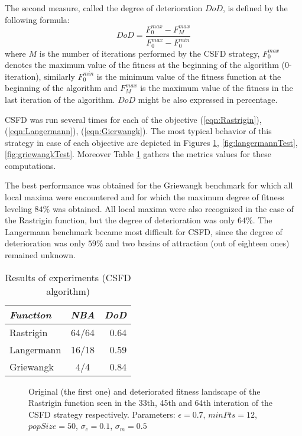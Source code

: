 The second measure, called the degree of deterioration $DoD$, is
defined by the following formula:
\begin{equation}
\label{eq:dod}
DoD = \frac{F_0^{max} - F_M^{max}}{F_0^{max} - F_0^{min}}
\end{equation}
where $M$ is the number of iterations performed by the CSFD strategy, 
$F_0^{max}$ denotes the maximum value of the fitness at the beginning of the 
algorithm ($0$-iteration), similarly $F_0^{min}$ is the minimum value of the
fitness function at the beginning of the algorithm and $F_M^{max}$ is the 
maximum value of the fitness in the last iteration of the algorithm.
$DoD$ might be also expressed in percentage.

CSFD was run several times for each of the objective 
(\ref{eqn:Rastrigin}), (\ref{eqn:Langermann}), (\ref{eqn:Gierwangk}).
The most typical behavior of this strategy in case of each objective
are depicted in Figures 
\ref{fig:rastriginTest}, \ref{fig:langermannTest}, \ref{fig:griewangkTest}.
Moreover Table \ref{tab:resultsCsfd} gathers the metrics values for these
computations.

The best performance was obtained for the Griewangk benchmark for which
all local maxima were encountered and for which the maximum degree 
of fitness leveling $84\%$ was obtained.
All local maxima were also recognized in the case of the Rastrigin function,
but the degree of deterioration was only $64\%$. The Langermann benchmark
became most difficult for CSFD, since the degree of deterioration was only
$59\%$ and two basins of attraction (out of eighteen ones) remained unknown. 

\begin{table}
\begin{center}
\caption{Results of experiments (CSFD algorithm)}
\begin{tabular}{| l | c | r |}
\hline
\label{tab:resultsCsfd}
\textit{Function} & \textit{NBA} & \textit{DoD} \\ \hline \hline
Rastrigin & 64/64 & 0.64 \\ \hline
Langermann & 16/18 & 0.59 \\ \hline
Griewangk & 4/4 & 0.84 \\ \hline
\end{tabular}
\end{center}
\end{table}


\begin{figure}
  \centering
  \caption{Original (the first one) and deteriorated fitness landscape 
  of the Rastrigin function seen in the 33th, 45th and 64th interation 
  of the CSFD strategy respectively. 
  Parameters: $\epsilon=0.7$, $minPts=12$, $popSize=50$,
  $\sigma_c=0.1$, $\sigma_m=0.5$}
  \label{fig:rastriginTest}
\end{figure}


